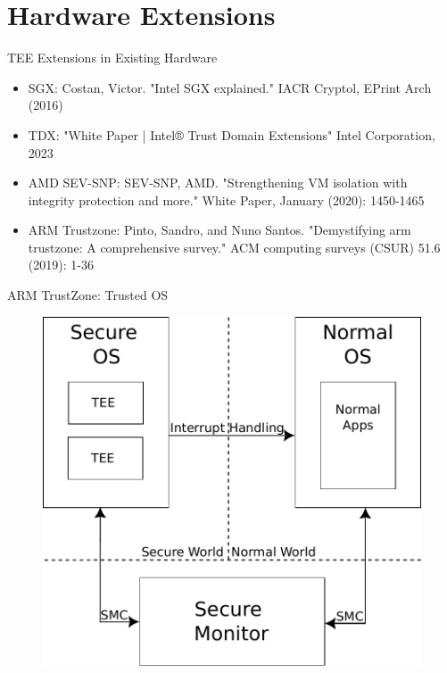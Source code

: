 \documentclass[aspectratio=169]{beamer}
\begin{document}
\section{Hardware Extensions}
\begin{frame}{TEE Extensions in Existing Hardware}
    \begin{itemize}
        \item SGX: Costan, Victor. "Intel SGX explained." {\footnotesize{IACR Cryptol, EPrint Arch (2016)}}
        \item TDX: "White Paper | Intel® Trust Domain Extensions" {\footnotesize{Intel Corporation, 2023}}
        \item AMD SEV-SNP: SEV-SNP, AMD. "Strengthening VM isolation with integrity protection and more." {\footnotesize{White Paper, January (2020): 1450-1465}}
        \item ARM Trustzone: Pinto, Sandro, and Nuno Santos. "Demystifying arm trustzone: A comprehensive survey." {\footnotesize{ACM computing surveys (CSUR) 51.6 (2019): 1-36}}
    \end{itemize}
\end{frame}
\begin{frame}{ARM TrustZone: Trusted OS}
    \begin{figure}
        \includegraphics[width=.5\textwidth]{images/trustzone_trusted_os.pdf}
    \end{figure}
\end{frame}
\end{document}

